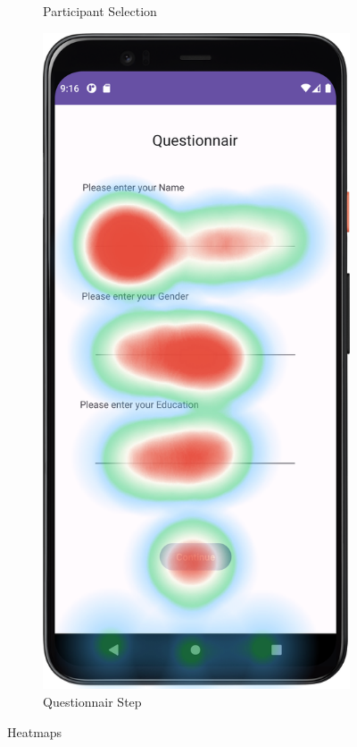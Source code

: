 \begin{figure}[htbp]
\begin{subfigure}[b]{0.25\textwidth}
        \caption{Participant Selection}
        \label{subfig:heatmapB}
    \end{subfigure}
        \hspace{1cm}
    \begin{subfigure}[b]{0.25\textwidth}
        \centering
        \includegraphics[width=\textwidth]{content/07_evaluation_of_the_solution/HeatMap_QuestionnairScreen.png}
        \caption{Questionnair Step}
        \label{subfig:heatmapC}
    \end{subfigure}
       \caption{Heatmaps}
       \label{fig:heatmaps}
\end{figure}

